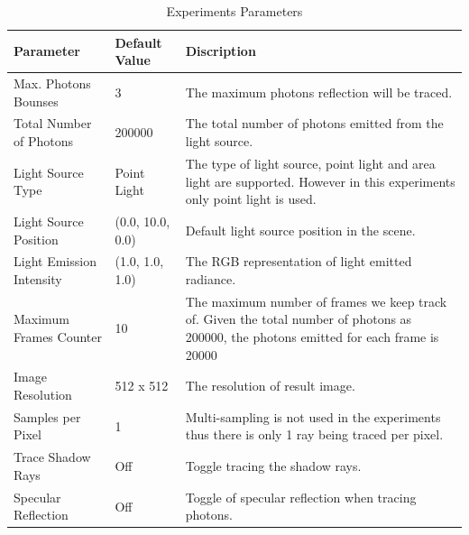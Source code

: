 \begin{table}[ht]
\begin{center}
	
	\renewcommand{\arraystretch}{1.2}
	\begin{tabular}{p{5cm}p{3cm}p{5cm}}
	
	Parameter  				& 		Default Value 		&		Discription \\ 
	
	\hline 

	Max. Photons Bounses		& 		3					&		The maximum photons reflection will be traced. \\  

	\hline 					

	Total Number of Photons 	& 		200000				&		The total number of photons emitted from the light 																	source. \\

	\hline

	Light Source Type			& 		Point Light			& 		The type of light source, point light and area light
																are supported. However in this experiments only point 																	light is used. \\ 
	
	\hline
	
	Light Source Position 		& 	 	(0.0, 10.0, 0.0)		&		Default light source position in the scene. \\  


	\hline 
	
	Light Emission Intensity	&		(1.0, 1.0, 1.0)		&		The RGB representation of light emitted radiance.\\  

	\hline 

	Maximum Frames Counter 	& 		10 					& 		The maximum number of frames we keep track of. Given 																	the total number of photons as 200000, the photons 																	emitted for each frame is 20000\\

	\hline
	
	Image Resolution 			&		512 x 512				&		The resolution of result image. \\

	\hline 
	
	Samples per Pixel			& 		1 					& 		Multi-sampling is not used in the experiments thus 																	there is only 1 ray being traced per pixel.\\
	
	\hline 
	
	Trace Shadow Rays			&		Off					& 		Toggle tracing the shadow rays. \\

	\hline

	Specular Reflection		&		Off					&		Toggle of specular reflection when tracing photons. \\

	\hline
	
	\end{tabular}
\end{center} 
\caption{Experiments Parameters}
\label{tab:expr_params}
\end{table}

